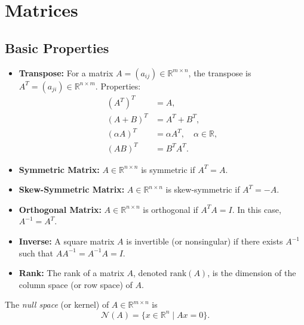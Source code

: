 \section{Matrices}

\subsection{Basic Properties}

\begin{itemize}
    \item \textbf{Transpose:} For a matrix $A=(a_{ij}) \in \mathbb{R}^{m \times n}$, the transpose is $A^T=(a_{ji}) \in \mathbb{R}^{n \times m}$.  
    Properties:
    \begin{align}
        (A^T)^T &= A, \\
        (A+B)^T &= A^T + B^T, \\
        (\alpha A)^T &= \alpha A^T, \quad \alpha \in \mathbb{R}, \\
        (AB)^T &= B^T A^T.
    \end{align}
    
    \item \textbf{Symmetric Matrix:} $A \in \mathbb{R}^{n \times n}$ is symmetric if $A^T = A$.

    \item \textbf{Skew-Symmetric Matrix:} $A \in \mathbb{R}^{n \times n}$ is skew-symmetric if $A^T = -A$.

    \item \textbf{Orthogonal Matrix:} $A \in \mathbb{R}^{n \times n}$ is orthogonal if $A^T A = I$.  
    In this case, $A^{-1} = A^T$.

    \item \textbf{Inverse:} A square matrix $A$ is invertible (or nonsingular) if there exists $A^{-1}$ such that $AA^{-1}=A^{-1}A=I$.

    \item \textbf{Rank:} The rank of a matrix $A$, denoted $\mathrm{rank}(A)$, is the dimension of the column space (or row space) of $A$.
\end{itemize}

\begin{definition}
The \emph{null space} (or kernel) of $A \in \mathbb{R}^{m \times n}$ is
\begin{equation}
\mathcal{N}(A) = \{x \in \mathbb{R}^n \mid Ax = 0\}.
\end{equation}
\end{definition}

